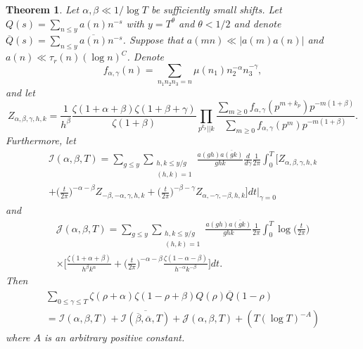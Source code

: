 \documentclass[oneside, 12pt]{amsart}
\newtheorem{thm}{Theorem}
\theoremstyle{definition}
\newcommand{\mc}{\mathcal}
\newcommand{\ol}{\overline}
\newcommand{\leqs}{\leqslant }
\newcommand{\geqs}{\geqslant }
\newcommand{\ben}{\begin{equation}}
\newcommand{\een}{\end{equation} }
\begin{document}
\begin{thm} 
\label{twisted moment thm}
Let $\alpha,\beta \ll 1/\log T$ be sufficiently small shifts. Let $Q(s)=\sum_{n\leqs y}a(n)n^{-s}$ with $y=T^\theta$ and $\theta<1/2$ and denote $\ol{Q}(s)=\sum_{n\leqs y}\ol{a(n)}n^{-s}$. Suppose that $a(mn)\ll |a(m)a(n)|$ and $a(n)\ll \tau_r(n)(\log n)^C$.   Denote
\begin{equation}\label{f}
f_{\alpha,\gamma}(n)=\sum_{n_1n_2n_3=n}\mu(n_1)n_2^{-\alpha}n_3^{-\gamma},
\end{equation}
and let
\ben
\label{Z}
    Z_{\alpha,\beta,\gamma,h,k}
  =\frac{1}{h^\beta}
    \frac{\zeta(1+\alpha+\beta)\zeta(1+\beta+\gamma)}{\zeta(1+\beta)}
     \prod_{p^{k_p} || k}\frac{\sum_{m\geqs 0}f_{\alpha,\gamma}(p^{m+k_p})p^{-m(1+\beta)}}{\sum_{m\geqs 0}f_{\alpha,\gamma}(p^{m})p^{-m(1+\beta)}}.
\een
Furthermore, let 
\begin{multline}
\label{mc I}
\mc{I}(\alpha,\beta,T)=\sum_{g\leqs y}\sum_{\substack{h,k\leqs y/g\\(h,k)=1}}\frac{a(gh)\ol{a(gk)}}{ghk}
               \frac{d}{d\gamma}
              \frac{1}{2\pi} \int_0^T\bigg[ 
               Z_{\alpha,\beta,\gamma,h,k}
     \\  + \bigg(\frac{t}{2\pi}\bigg)^{-\alpha-\beta}Z_{-\beta,-\alpha,\gamma,h,k}
      + \bigg(\frac{t}{2\pi}\bigg)^{-\beta-\gamma}Z_{\alpha,-\gamma,-\beta,h,k}
     \bigg]dt
     \bigg|_{\gamma=0}
\end{multline}
and
\begin{multline}
\label{mc J}
          \mc{J}(\alpha,\beta,T)
          =
            \sum_{g\leqs y}\sum_{\substack{h,k\leqs y/g\\(h,k)=1}}\frac{a(gh)\ol{a(gk)}}{ghk}
              \frac{1}{2\pi}\int_0^T\log\bigg(\frac{t}{2\pi}\bigg)
              \\\times\bigg[
              \frac{\zeta(1+\alpha+\beta)}{h^{\beta}k^{\alpha}}
      + \bigg(\frac{t}{2\pi}\bigg)^{-\alpha-\beta}
             \frac{\zeta(1-\alpha-\beta)}{h^{-\alpha}k^{-\beta}}
             \bigg]dt.
\end{multline}
Then
\begin{multline}
\label{twisted moment eq}
          \sum_{0\leqs \gamma\leqs T}\zeta(\rho+\alpha)\zeta(1-\rho+\beta)Q(\rho)\ol{Q}(1-\rho)\\
  =  \mc{I}(\alpha,\beta,T)+\ol{\mc{I}(\ol{\beta},\ol{\alpha},T)}+\mc{J}(\alpha,\beta,T)+(T(\log T)^{-A})
\end{multline}
where $A$ is an arbitrary positive constant.  
\end{thm}
\end{document}
